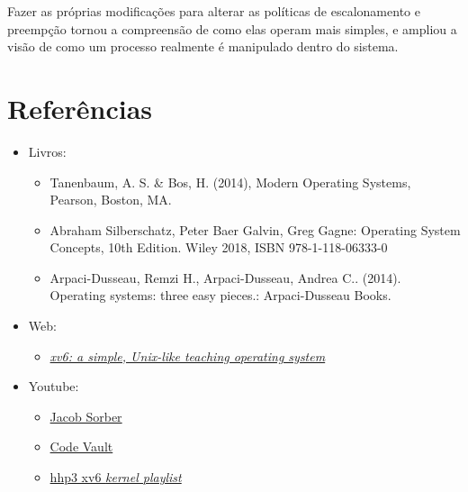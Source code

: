 \documentclass{article}
\begin{document}
Fazer as próprias modificações para alterar as políticas de escalonamento e
preempção tornou a compreensão de como elas operam mais simples, e ampliou
a visão de como um processo realmente é manipulado dentro do sistema.

\section{Referências}

\begin{itemize}
      \item Livros:
            \begin{itemize}
                  \item Tanenbaum, A. S. \& Bos, H. (2014), Modern Operating
                        Systems, Pearson, Boston, MA.
                  \item Abraham Silberschatz, Peter Baer Galvin, Greg Gagne:
                        Operating System Concepts, 10th Edition. Wiley 2018,
                        ISBN
                        978-1-118-06333-0
                  \item Arpaci-Dusseau, Remzi H., Arpaci-Dusseau, Andrea C..
                        (2014).
                        Operating systems: three easy pieces.: Arpaci-Dusseau
                        Books.
            \end{itemize}

      \item Web:
            \begin{itemize}
                  \item

                        \href{https://pdos.csail.mit.edu/6.828/2023/xv6/book-riscv-rev3.pdf}{\textit{xv6:
                                    a
                                    simple, Unix-like teaching operating
                                    system}}
            \end{itemize}

      \item Youtube:
            \begin{itemize}
                  \item \href{https://www.youtube.com/@JacobSorber}{Jacob
                              Sorber}
                  \item \href{https://www.youtube.com/@CodeVault}{Code Vault}
                  \item

                        \href{https://www.youtube.com/watch?v=fWUJKH0RNFE&list=PLbtzT1TYeoMhTPzyTZboW_j7TPAnjv9XB}{hhp3
                              xv6 \textit{kernel playlist}}
            \end{itemize}

\end{itemize}
\end{document}
